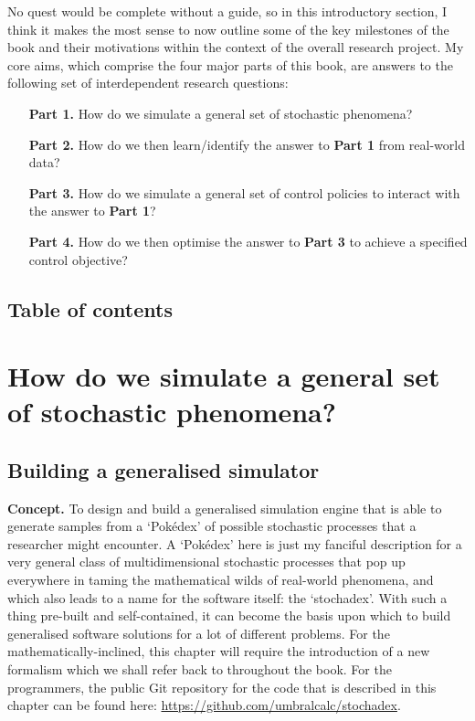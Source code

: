 \documentclass{book}
\begin{document}
No quest would be complete without a guide, so in this introductory section, I think it makes the most sense to now outline some of the key milestones of the book and their motivations within the context of the overall research project. My core aims, which comprise the four major parts of this book, are answers to the following set of interdependent research questions:

\begin{enumerate}[leftmargin=2.5\parindent] 
\item[{\bfseries\sffamily Part 1.}]{How do we simulate a general set of stochastic phenomena?}
\item[{\bfseries\sffamily Part 2.}]{How do we then learn/identify the answer to {\bfseries\sffamily Part 1} from real-world data?}
\item[{\bfseries\sffamily Part 3.}]{How do we simulate a general set of control policies to interact with the answer to {\bfseries\sffamily Part 1}?}
\item[{\bfseries\sffamily Part 4.}]{How do we then optimise the answer to {\bfseries\sffamily Part 3} to achieve a specified control objective?} 
\end{enumerate}



\chapter*{Table of contents}
\vspace*{-3cm}
{\sffamily \tableofcontents}
\mainmatter


\part*{{ How do we simulate a general set of stochastic phenomena?}}


\chapter{\sffamily Building a generalised simulator}

{\bfseries\sffamily Concept.} To design and build a generalised simulation engine that is able to generate samples from a `Pokédex' of possible stochastic processes that a researcher might encounter. A `Pokédex' here is just my fanciful description for a very general class of multidimensional stochastic processes that pop up everywhere in taming the mathematical wilds of real-world phenomena, and which also leads to a name for the software itself: the `stochadex'. With such a thing pre-built and self-contained, it can become the basis upon which to build generalised software solutions for a lot of different problems. For the mathematically-inclined, this chapter will require the introduction of a new formalism which we shall refer back to throughout the book. For the programmers, the public Git repository for the code that is described in this chapter can be found here: \href{https://github.com/umbralcalc/stochadex}{https://github.com/umbralcalc/stochadex}.
\end{document}
